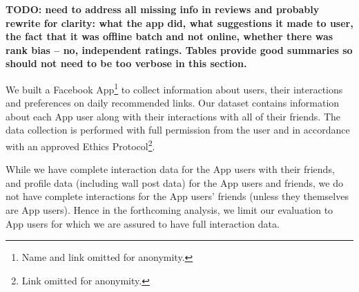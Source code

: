 
{\bf TODO: need to address all missing info in reviews and probably rewrite for clarity: what the app did, what suggestions it made to user, the fact that it was offline batch and not online, whether there was rank bias -- no, independent ratings.  Tables provide good summaries so should not need to be too verbose in this section.}

We built a Facebook App\footnote{Name and link omitted
for anonymity.} to collect information about users, 
their interactions and preferences on daily recommended links.  
Our dataset contains information about each App user along with their
interactions with all of their friends.  The
data collection is performed with full permission from the user and in
accordance with an approved Ethics Protocol\footnote{Link omitted for
anonymity.}.


While we have complete interaction data for the App users with their
friends, and profile data (including wall post data) for the App users
and friends, we do not have complete interactions for the App users'
friends (unless they themselves are App users).  Hence in the
forthcoming analysis, we limit our evaluation to App users for which
we are assured to have full interaction data.

